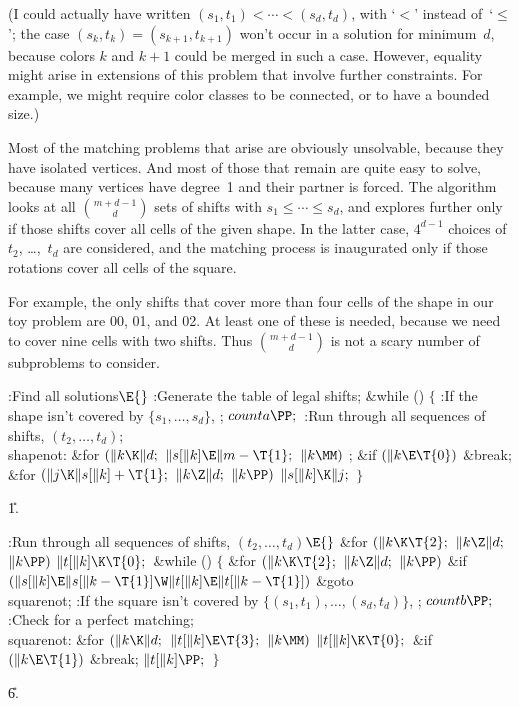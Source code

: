 (I could actually have written $(s_1,t_1)<\cdots<(s_d,t_d)$,
with `$<$' instead of~`$\le$';
the case $(s_k,t_k)=(s_{k+1},t_{k+1})$ won't occur in a solution
for minimum~$d$, because colors $k$ and $k+1$ could be merged in such
a case. However, equality might arise in
extensions of this problem that involve further constraints.
For example, we might
require color classes to be connected, or to have a bounded size.)

Most of the matching problems that arise are obviously unsolvable,
because they have isolated vertices. And most of those that
remain are quite easy to solve, because many vertices have degree~1
and their partner is forced. The algorithm looks at all $m+d-1\choose d$
sets of shifts with $s_1\le\cdots\le s_d$, and explores further only if those
shifts cover all cells of the given shape. In the latter case,
$4^{d-1}$ choices of $t_2$, \dots,~$t_d$ are considered, and the
matching process is inaugurated only if those rotations cover
all cells of the square.

For example, the only shifts that cover more than four cells of the shape
in our toy problem are 00, 01, and 02. At least one of these is needed, because
we need to cover nine cells with two shifts. Thus $m+d-1\choose d$ is
not a scary number of subproblems to consider.

\Y\B\4:Find all solutions\X${}\E{}$\6
:Generate the table of legal shifts\X;\6
\&{while} ()\5
${}\{{}$\1\6
:If the shape isn't covered by $\{s_1,\ldots,s_d\}$, \X;\6
${}\\{counta}\PP;{}$\6
:Run through all sequences of shifts, $(t_2,\ldots,t_d)$\X;\6
\4\\{shapenot}:\5
\&{for} ${}(\|k\K\|d;{}$ ${}\|s[\|k]\E\|m-\T{1};{}$ ${}\|k\MM){}$\1\5
;\2\6
\&{if} ${}(\|k\E\T{0}){}$\1\5
\&{break};\2\6
\&{for} ${}(\|j\K\|s[\|k]+\T{1};{}$ ${}\|k\Z\|d;{}$ ${}\|k\PP){}$\1\5
${}\|s[\|k]\K\|j;{}$\2\6
\4${}\}{}$\2\par
\U1.\fi

\B{}:Run through all sequences of shifts, $(t_2,\ldots,t_d)$\X${}\E{}$\6
\&{for} ${}(\|k\K\T{2};{}$ ${}\|k\Z\|d;{}$ ${}\|k\PP){}$\1\5
${}\|t[\|k]\K\T{0};{}$\2\6
\&{while} ()\5
${}\{{}$\1\6
\&{for} ${}(\|k\K\T{2};{}$ ${}\|k\Z\|d;{}$ ${}\|k\PP){}$\1\6
\&{if} ${}(\|s[\|k]\E\|s[\|k-\T{1}]\W\|t[\|k]\E\|t[\|k-\T{1}]){}$\1\5
\&{goto} \\{squarenot};\2\2\6
:If the square isn't covered by $\{(s_1,t_1),\ldots,(s_d,t_d)\}$, \X;\6
${}\\{countb}\PP;{}$\6
:Check for a perfect matching\X;\6
\4\\{squarenot}:\5
\&{for} ${}(\|k\K\|d;{}$ ${}\|t[\|k]\E\T{3};{}$ ${}\|k\MM){}$\1\5
${}\|t[\|k]\K\T{0};{}$\2\6
\&{if} ${}(\|k\E\T{1}){}$\1\5
\&{break};\2\6
${}\|t[\|k]\PP;{}$\6
\4${}\}{}$\2\par
\U6.\fi

